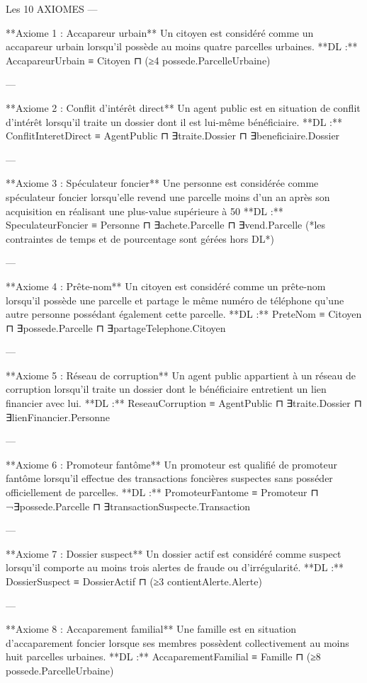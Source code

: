 Les 10 AXIOMES 
---

**Axiome 1 : Accapareur urbain**
Un citoyen est considéré comme un accapareur urbain lorsqu'il possède au moins quatre parcelles urbaines.
**DL :**
AccapareurUrbain ≡ Citoyen ⊓ (≥4 possede.ParcelleUrbaine)

---

**Axiome 2 : Conflit d'intérêt direct**
Un agent public est en situation de conflit d'intérêt lorsqu'il traite un dossier dont il est lui-même bénéficiaire.
**DL :**
ConflitInteretDirect ≡ AgentPublic ⊓ ∃traite.Dossier ⊓ ∃beneficiaire.Dossier

---

**Axiome 3 : Spéculateur foncier**
Une personne est considérée comme spéculateur foncier lorsqu'elle revend une parcelle moins d'un an après son acquisition en réalisant une plus-value supérieure à 50 %
**DL :**
SpeculateurFoncier ≡ Personne ⊓ ∃achete.Parcelle ⊓ ∃vend.Parcelle
(*les contraintes de temps et de pourcentage sont gérées hors DL*)

---

**Axiome 4 : Prête-nom**
Un citoyen est considéré comme un prête-nom lorsqu'il possède une parcelle et partage le même numéro de téléphone qu'une autre personne possédant également cette parcelle.
**DL :**
PreteNom ≡ Citoyen ⊓ ∃possede.Parcelle ⊓ ∃partageTelephone.Citoyen

---

**Axiome 5 : Réseau de corruption**
Un agent public appartient à un réseau de corruption lorsqu'il traite un dossier dont le bénéficiaire entretient un lien financier avec lui.
**DL :**
ReseauCorruption ≡ AgentPublic ⊓ ∃traite.Dossier ⊓ ∃lienFinancier.Personne

---

**Axiome 6 : Promoteur fantôme**
Un promoteur est qualifié de promoteur fantôme lorsqu'il effectue des transactions foncières suspectes sans posséder officiellement de parcelles.
**DL :**
PromoteurFantome ≡ Promoteur ⊓ ¬∃possede.Parcelle ⊓ ∃transactionSuspecte.Transaction

---

**Axiome 7 : Dossier suspect**
Un dossier actif est considéré comme suspect lorsqu'il comporte au moins trois alertes de fraude ou d'irrégularité.
**DL :**
DossierSuspect ≡ DossierActif ⊓ (≥3 contientAlerte.Alerte)

---

**Axiome 8 : Accaparement familial**
Une famille est en situation d'accaparement foncier lorsque ses membres possèdent collectivement au moins huit parcelles urbaines.
**DL :**
AccaparementFamilial ≡ Famille ⊓ (≥8 possede.ParcelleUrbaine)

